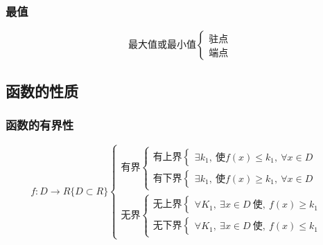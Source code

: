 \subsubsection{最值}
$$\mbox{最大值或最小值}\begin{cases}
    \mbox{驻点}\\
    \mbox{端点}
\end{cases}$$
 \subsection{函数的性质}
 \subsubsection{函数的有界性}
 $$f:D\rightarrow R\{D\subset R\}\begin{cases}
    \mbox{有界}\begin{cases}
        \mbox{有上界}\begin{cases}
            \exists k_1,\ \mbox{使}f(x)\leqslant k_1,\ \forall x\in D  
        \end{cases}\\
        \mbox{有下界}\begin{cases}
            \exists k_1,\ \mbox{使}f(x)\geqslant  k_1,\ \forall x\in D  
        \end{cases}
    \end{cases}\\
    \mbox{无界}\begin{cases}
        \mbox{无上界}\begin{cases}
            \forall K_1,\ \exists x\in D\ \mbox{使},\ f(x)\geqslant  k_1
        \end{cases}\\
        \mbox{无下界}\begin{cases}
            \forall K_1,\ \exists x\in D\ \mbox{使},\ f(x)\leqslant  k_1
        \end{cases}
    \end{cases}
 \end{cases}$$
